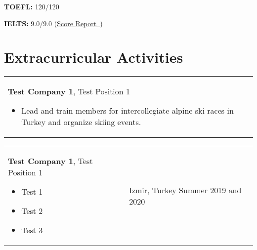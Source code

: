 \documentclass[10pt, a4paper]{article}
\newenvironment{highlights}{
        \begin{itemize}[
                topsep=0pt,
                parsep=0.07 cm,
                partopsep=0pt,
                itemsep=0pt,
                after=\vspace*{-1\baselineskip},
                leftmargin=0.6 cm + 3pt
            ]
    }{
        \end{itemize}
    } %
\let\hrefWithoutArrow\href
\renewcommand{\href}[2]{\hrefWithoutArrow{#1}{#2\, \raisebox{.1ex}{\footnotesize \faExternalLink*}}}
\begin{document}
            \textbf{TOEFL:} 120/120

            \setlength{\leftskip}{0cm}
            \setlength{\rightskip}{0cm}

        \vspace*{0.12 cm}
        
            \setlength{\leftskip}{0.2 cm}
            \setlength{\rightskip}{0.2 cm}

            \textbf{IELTS:} 9.0/9.0 (\href{https://example.com/}{Score Report})

            \setlength{\leftskip}{0cm}
            \setlength{\rightskip}{0cm}



    \section{Extracurricular Activities}
    
        \begin{tabularx}{\textwidth}{K{0.2 cm} R{3.6 cm}}
            \textbf{Test Company 1}, Test Position 1
            \vspace*{0.12 cm}
            \begin{highlights}
                \item Lead and train members for intercollegiate alpine ski races in Turkey and organize skiing events.
            \end{highlights}
        &
            \end{tabularx}

        \vspace*{0.12 cm}
        
        \begin{tabularx}{\textwidth}{K{0.2 cm} R{3.6 cm}}
            \textbf{Test Company 1}, Test Position 1
            \vspace*{0.12 cm}
            \begin{highlights}
                \item Test 1
                \item Test 2
                \item Test 3
            \end{highlights}
        &
            Izmir, Turkey  \hspace*{-0.2cm + 0.2 cm} \newline
            Summer 2019 and 2020 \hspace*{-0.2cm + 0.2 cm}
        \end{tabularx}
\end{document}
